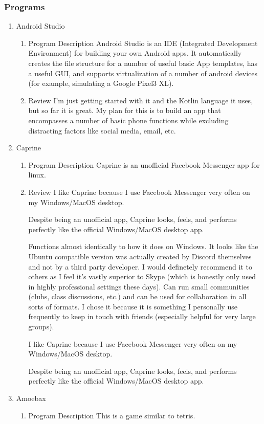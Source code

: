 \documentclass{article}
\begin{document}
\subsubsection{Programs}
\label{sec:org77d9a70}
\begin{enumerate}
\item Android Studio
\label{sec:org30150aa}
\begin{enumerate}
\item Program Description
\label{sec:org6170544}
Android Studio is an IDE (Integrated Development Environment) for building your own Android apps.
It automatically creates the file structure for a number of useful basic App templates, has a useful GUI, and supports virtualization of a number of android devices (for example, simulating a Google Pixel3 XL).
\item Review
\label{sec:org805bb20}
I'm just getting started with it and the Kotlin language it uses, but so far it is great. My plan for this is to build an app that encompasses a number of basic phone functions while excluding distracting factors like social media, email, etc.
\end{enumerate}
\item Caprine
\label{sec:org6d3f46b}
\begin{enumerate}
\item Program Description
\label{sec:org8637256}
Caprine is an unofficial Facebook Messenger app for linux.
\item Review
\label{sec:orge576d72}
I like Caprine because I use Facebook Messenger very often on my Windows/MacOS desktop.

Despite being an unofficial app, Caprine looks, feels, and performs perfectly like the official Windows/MacOS desktop app.

Functions almost identically to how it does on Windows. It looks like the Ubuntu compatible version was actually created by Discord themselves and not by a third party developer. I would definetely recommend it to others as I feel it's vastly superior to Skype (which is honestly only used in highly professional settings these days). Can run small communities (clubs, class discussions, etc.) and can be used for collaboration in all sorts of formats. I chose it because it is something I personally use frequently to keep in touch with friends (especially helpful for very large groups).

I like Caprine because I use Facebook Messenger very often on my Windows/MacOS desktop.

Despite being an unofficial app, Caprine looks, feels, and performs perfectly like the official Windows/MacOS desktop app.
\end{enumerate}
\item Amoebax
\label{sec:orgb622046}
\begin{enumerate}
\item Program Description
\label{sec:org51d9532}
This is a game similar to tetris.


\end{enumerate}
\end{enumerate}
\end{document}
